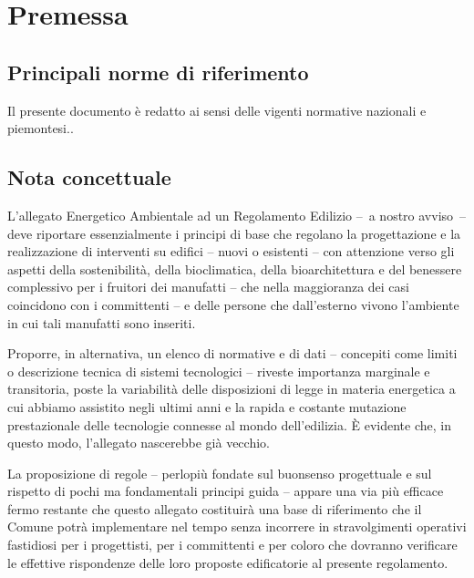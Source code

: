 
\chapter{Premessa}
\label{chp:premessa}

\section{Principali norme di riferimento}
\label{sec:norme-riferimento-princ}

Il presente documento è redatto ai sensi delle vigenti normative nazionali e piemontesi..


\section{Nota concettuale}
\label{sec:nota-import}

L'allegato Energetico Ambientale ad un Regolamento Edilizio –~a nostro avviso~– deve riportare essenzialmente i principi di base che regolano la progettazione e la realizzazione di interventi su edifici – nuovi o esistenti – con attenzione verso gli aspetti della sostenibilità, della bioclimatica, della bioarchitettura e del benessere complessivo per i fruitori dei manufatti  – che nella maggioranza dei casi coincidono con i committenti – e delle persone che dall'esterno vivono l'ambiente in cui tali manufatti sono inseriti.

Proporre, in alternativa, un elenco di normative e di dati – concepiti come limiti o descrizione tecnica di sistemi tecnologici – riveste importanza marginale e transitoria, poste la variabilità delle disposizioni di legge in materia energetica a cui abbiamo assistito negli ultimi anni e la rapida e costante mutazione prestazionale delle tecnologie connesse al mondo dell'edilizia. È evidente che, in questo modo, l'allegato nascerebbe già vecchio.

La proposizione di regole – perlopiù fondate sul buonsenso progettuale e sul rispetto di pochi ma fondamentali principi guida – appare una via più efficace  fermo restante che questo allegato costituirà una base di riferimento che il Comune potrà implementare  nel tempo senza incorrere in stravolgimenti operativi fastidiosi per i progettisti, per i committenti e per coloro che dovranno verificare le effettive rispondenze delle loro proposte edificatorie al presente regolamento.




